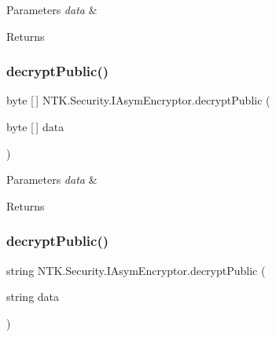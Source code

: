 \begin{DoxyParams}{Parameters}
{\em data} & \\
\hline
\end{DoxyParams}
\begin{DoxyReturn}{Returns}

\end{DoxyReturn}
\mbox{\label{interface_n_t_k_1_1_security_1_1_i_asym_encryptor_a4816a10a16999b7d109fd58c312a4657}} 
\subsubsection{\texorpdfstring{decryptPublic()}{decryptPublic()}\hspace{0.1cm}{\footnotesize\ttfamily [1/2]}}
{\footnotesize\ttfamily byte \mbox{[}$\,$\mbox{]} N\+T\+K.\+Security.\+I\+Asym\+Encryptor.\+decrypt\+Public (\begin{DoxyParamCaption}\item[{byte \mbox{[}$\,$\mbox{]}}]{data }\end{DoxyParamCaption})}






\begin{DoxyParams}{Parameters}
{\em data} & \\
\hline
\end{DoxyParams}
\begin{DoxyReturn}{Returns}

\end{DoxyReturn}
\mbox{\label{interface_n_t_k_1_1_security_1_1_i_asym_encryptor_aa34d16c0af4b5d2249eca96920061c32}} 
\subsubsection{\texorpdfstring{decryptPublic()}{decryptPublic()}\hspace{0.1cm}{\footnotesize\ttfamily [2/2]}}
{\footnotesize\ttfamily string N\+T\+K.\+Security.\+I\+Asym\+Encryptor.\+decrypt\+Public (\begin{DoxyParamCaption}\item[{string}]{data }\end{DoxyParamCaption})}






